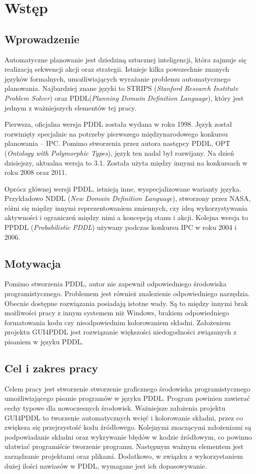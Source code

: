 \chapter{Wstęp}
\section{Wprowadzenie}
	Automatyczne planowanie jest dziedziną sztucznej inteligencji, która zajmuje się realizacją sekwencji akcji oraz strategii. Istnieje kilka powszechnie znanych języków formalnych, umożliwiających wyrażanie problemu automatycznego planowania. Najbardziej znane języki to STRIPS (\textit{Stanford Research Institute Problem Solver}) oraz PDDL(\textit{Planning Domain Definition Language}), który jest jednym z ważniejszych elementów tej pracy.
	
	Pierwsza, oficjalna wersja PDDL została wydana w roku 1998.  Język został rozwinięty specjalnie na potrzeby pierwszego międzynarodowego konkursu planowania – IPC. Pomimo stworzenia przez autora następcy PDDL, OPT (\textit{Ontology with Polymorphic Types}), język ten nadal był rozwijany. Na dzień dzisiejszy, aktualna wersja to 3.1. Została użyta między innymi na konkursach w roku 2008 oraz 2011.

	Oprócz głównej wersji PDDL, istnieją  inne, wyspecjalizowane warianty języka. Przykładowo  NDDL (\textit{New Domain Definition Language}), stworzony przez NASA, różni się między innymi reprezentowaniem zmiennych, czy ideą wykorzystywania aktywności i ograniczeń między nimi a koncepcją stanu i akcji. Kolejna wersja to PPDDL (\textit{Probabilistic PDDL}) używany podczas konkursu IPC w roku 2004 i 2006.


\section{Motywacja}
Pomimo stworzenia PDDL, autor nie zapewnił odpowiedniego środowiska programistycznego. Problemem jest również znalezienie odpowiedniego narzędzia. Obecnie dostępne rozwiązania posiadają istotne wady. Są to między innymi brak możliwości pracy z innym systemem  niż Windows, brakiem odpowiedniego formatowania kodu czy nieodpowiednim kolorowaniem składni. Założeniem projektu GUI4PDDL jest rozwiązanie większości niedogodności związanych z pisaniem w języku PDDL.
\section{Cel i zakres pracy}
Celem pracy jest stworzenie stworzenie graficznego środowiska programistycznego umożliwiającego pisanie programów w języku PDDL. Program powinien zawierać cechy typowe dla nowoczesnych środowisk. Ważniejsze założenia projektu GUI4PDDL to tworzenie automatycznych wcięć i kolorowanie składni, przez co zwiększa się przejrzystość kodu źródłowego. Kolejnymi znaczącymi założeniami są podpowiadanie składni oraz wykrywanie błędów w kodzie źródłowym, co powinno ułatwiać programiście tworzenie programu. Następnym ważnym elementem jest zarządzanie projektami oraz plikami. Dodatkowo, w związku z wykorzystaniem dużej ilości nawiasów w PDDL, wymagane jest ich dopasowywanie. 

